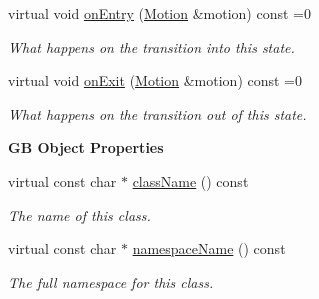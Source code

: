 \begin{Indent}
\begin{DoxyCompactItemize}
\mbox{\label{classrev_1_1_base_animation_state_a52bbd4184ec045c7452a27add215469a}} 
virtual void \mbox{\hyperlink{classrev_1_1_base_animation_state_a52bbd4184ec045c7452a27add215469a}{on\+Entry}} (\mbox{\hyperlink{classrev_1_1_motion}{Motion}} \&motion) const =0
\begin{DoxyCompactList}\small\item\em What happens on the transition into this state. \end{DoxyCompactList}\item 
\mbox{\label{classrev_1_1_base_animation_state_a69ce66ecd297e545056040f5830665d9}} 
virtual void \mbox{\hyperlink{classrev_1_1_base_animation_state_a69ce66ecd297e545056040f5830665d9}{on\+Exit}} (\mbox{\hyperlink{classrev_1_1_motion}{Motion}} \&motion) const =0
\begin{DoxyCompactList}\small\item\em What happens on the transition out of this state. \end{DoxyCompactList}\end{DoxyCompactItemize}
\end{Indent}
\begin{Indent}\textbf{ GB Object Properties}\par
\begin{DoxyCompactItemize}
\item 
virtual const char $\ast$ \mbox{\hyperlink{classrev_1_1_base_animation_state_a40d8ab21aeed4a7d7e0f88004c08d060}{class\+Name}} () const
\begin{DoxyCompactList}\small\item\em The name of this class. \end{DoxyCompactList}\item 
virtual const char $\ast$ \mbox{\hyperlink{classrev_1_1_base_animation_state_a97dd6a934ca133d2024b1db68dd3316d}{namespace\+Name}} () const
\begin{DoxyCompactList}\small\item\em The full namespace for this class. \end{DoxyCompactList}\end{DoxyCompactItemize}
\end{Indent}
